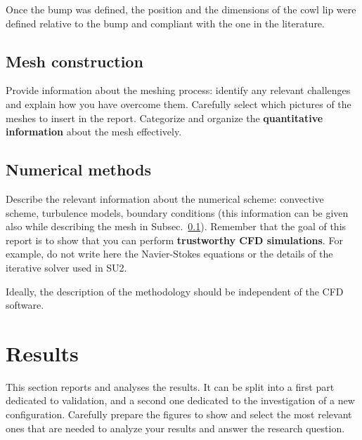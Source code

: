 \documentclass[11pt,a4paper]{article}
\begin{document}
\vspace{-0.2cm}
\begin{table}[H]
    \centering
    \caption{Characterizing bump parameters}
    \label{tab:Bump param}
\end{table}
\vspace{-0.4cm}
Once the bump was defined, the position and the dimensions of the cowl lip were defined relative to the bump and compliant with the one in the literature\cite{TEXT01}. 

\subsection{Mesh construction}\label{sec:mesh}
Provide information about the meshing process: identify any relevant challenges and explain how you have overcome them.
Carefully select which pictures of the meshes to insert in the report.
Categorize and organize the \textbf{quantitative information} about the mesh effectively.

\subsection{Numerical methods}
Describe the relevant information about the numerical scheme: convective scheme, turbulence models, boundary conditions (this information can be given also while describing the mesh in Subsec.~\ref{sec:mesh}).
Remember that the goal of this report is to show that you can perform \textbf{trustworthy CFD simulations}. For example, do not write here the Navier-Stokes equations or the details of the iterative solver used in SU2.

Ideally, the description of the methodology should be independent of the CFD software.

\section{Results}
This section reports and analyses the results. It can be split into a first part dedicated to validation, and a second one dedicated to the investigation of a new configuration.
Carefully prepare the figures to show and select the most relevant ones that are needed to analyze your results and answer the research question.
\end{document}
